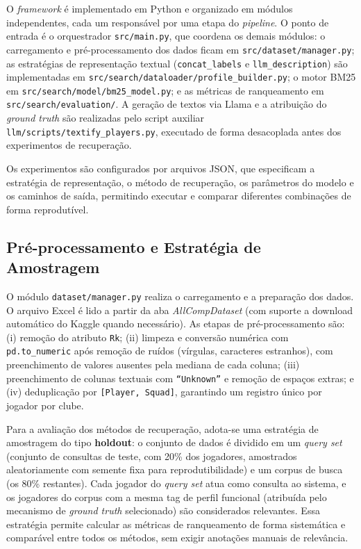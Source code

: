\documentclass[portuguese]{sbc2025}
\begin{document}
O \textit{framework} é implementado em Python e organizado em módulos independentes,
cada um responsável por uma etapa do \textit{pipeline}. O ponto de entrada é o
orquestrador \texttt{src/main.py}, que coordena os demais módulos: o carregamento
e pré-processamento dos dados ficam em \texttt{src/dataset/manager.py}; as estratégias
de representação textual (\texttt{concat\_labels} e \texttt{llm\_description}) são
implementadas em \texttt{src/search/dataloader/profile\_builder.py}; o motor BM25
em \texttt{src/search/model/bm25\_model.py}; e as métricas de ranqueamento em
\texttt{src/search/evaluation/}. A geração de textos via Llama e a atribuição do
\textit{ground truth} são realizadas pelo script auxiliar
\texttt{llm/scripts/textify\_players.py}, executado de forma desacoplada antes dos
experimentos de recuperação.

Os experimentos são configurados por arquivos JSON, que especificam a estratégia de
representação, o método de recuperação, os parâmetros do modelo e os caminhos de
saída, permitindo executar e comparar diferentes combinações de forma reprodutível.

\subsection{Pré-processamento e Estratégia de Amostragem}

O módulo \texttt{dataset/manager.py} realiza o carregamento e a preparação dos dados.
O arquivo Excel é lido a partir da aba \textit{AllCompDataset} (com suporte a download
automático do Kaggle quando necessário). As etapas de pré-processamento são:
(i) remoção do atributo \texttt{Rk}; (ii) limpeza e conversão numérica com
\texttt{pd.to\_numeric} após remoção de ruídos (vírgulas, caracteres estranhos),
com preenchimento de valores ausentes pela mediana de cada coluna; (iii) preenchimento
de colunas textuais com \texttt{``Unknown''} e remoção de espaços extras; e
(iv) deduplicação por \texttt{[Player, Squad]}, garantindo um registro único por
jogador por clube.

Para a avaliação dos métodos de recuperação, adota-se uma estratégia de amostragem
do tipo \textbf{holdout}: o conjunto de dados é dividido em um \textit{query set}
(conjunto de consultas de teste, com 20\% dos jogadores, amostrados aleatoriamente com
semente fixa para reprodutibilidade) e um corpus de busca (os 80\% restantes). Cada
jogador do \textit{query set} atua como consulta ao sistema, e os jogadores do corpus
com a mesma tag de perfil funcional (atribuída pelo mecanismo de \textit{ground truth}
selecionado) são considerados relevantes. Essa estratégia permite calcular as métricas
de ranqueamento de forma sistemática e comparável entre todos os métodos, sem exigir
anotações manuais de relevância.
\end{document}
